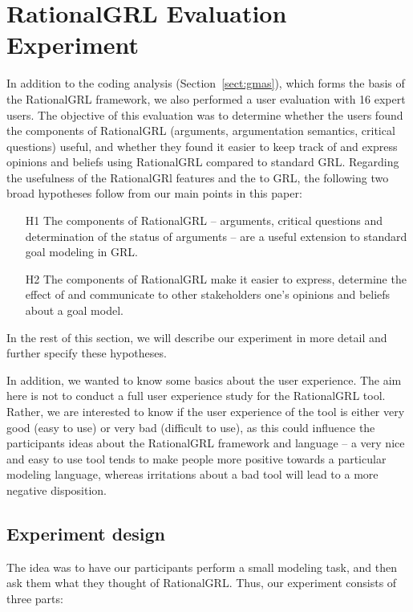\section{RationalGRL Evaluation Experiment}
\label{sect:validation}

In addition to the coding analysis (Section~\ref{sect:gmas}), which forms the basis of the RationalGRL framework, we also performed a user evaluation with 16 expert users. The objective of this evaluation was to determine whether the users found the components of RationalGRL (arguments, argumentation semantics, critical questions) useful, and whether they found it easier to keep track of and express opinions and beliefs using RationalGRL compared to standard GRL. Regarding the usefulness of the RationalGRl features and the to GRL, the following two broad hypotheses follow from our main points in this paper:

\begin{itemize}
\item[H1] The components of RationalGRL -- arguments, critical questions and determination of the status of arguments -- are a useful extension to standard goal modeling in GRL.
\item[H2] The components of RationalGRL make it easier to express, determine the effect of and communicate to other stakeholders one's opinions and beliefs about a goal model.
\end{itemize}

In the rest of this section, we will describe our experiment in more detail and further specify these hypotheses.

In addition, we wanted to know some basics about the user experience. The aim here is not to conduct a full user experience study for the RationalGRL tool. Rather, we are interested to know if the user experience of the tool is either very good (easy to use) or very bad (difficult to use), as this could influence the participants ideas about the RationalGRL framework and language -- a very nice and easy to use tool tends to make people more positive towards a particular modeling language, whereas irritations about a bad tool will lead to a more negative disposition. 

\subsection{Experiment design}

The idea was to have our participants perform a small modeling task, and then ask them what they thought of RationalGRL. Thus, our experiment consists of three parts:

